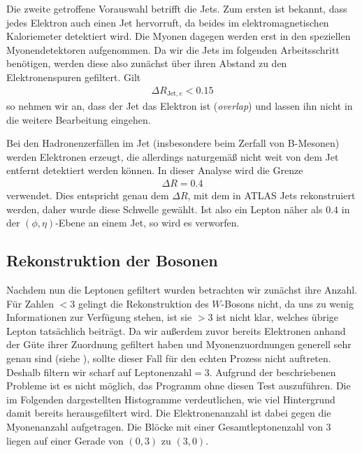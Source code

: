 Die zweite getroffene Vorauswahl betrifft die Jets. Zum ersten ist bekannt, dass
jedes Elektron auch einen Jet hervorruft, da beides im elektromagnetischen
Kaloriemeter detektiert wird. Die Myonen dagegen werden erst in den speziellen
Myonendetektoren aufgenommen. Da wir die Jets im folgenden Arbeitsschritt
benötigen, werden diese also zunächst über ihren Abstand zu den Elektronenspuren
gefiltert. Gilt
\begin{align}
  \Delta R_{\text{Jet},e} < 0.15
\end{align}
so nehmen wir an, dass der Jet das Elektron ist (\emph{overlap}) und lassen ihn
nicht in die weitere Bearbeitung eingehen.

Bei den Hadronenzerfällen im Jet (insbesondere beim Zerfall von B-Mesonen)
werden Elektronen erzeugt, die allerdings naturgemäß nicht weit von dem Jet
entfernt detektiert werden können. In dieser Analyse wird die Grenze
\begin{align}
  \Delta R = 0.4
\end{align}
verwendet. Dies entspricht genau dem $\Delta R$, mit dem in ATLAS Jets
rekonstruiert werden\cite{jet-recon}, daher wurde diese Schwelle gewählt. Ist
also ein Lepton näher als $0.4$ in der $(\phi, \eta)$-Ebene an einem Jet, so
wird es verworfen.

\subsection{Rekonstruktion der Bosonen}
Nachdem nun die Leptonen gefiltert wurden betrachten wir zunächst ihre Anzahl.
Für Zahlen $< 3$ gelingt die Rekonstruktion des $W$-Bosons nicht, da uns zu
wenig Informationen zur Verfügung stehen, ist sie $> 3$ ist nicht klar, welches
übrige Lepton tatsächlich beiträgt. Da wir außerdem zuvor bereits Elektronen
anhand der Güte ihrer Zuordnung gefiltert haben und Myonenzuordnungen generell
sehr genau sind (siehe \cite{myon-zuordnung}), sollte dieser Fall für den echten
Prozess nicht auftreten. Deshalb filtern wir scharf auf $\text{Leptonenzahl} =
3$. Aufgrund der beschriebenen Probleme ist es nicht möglich, das Programm ohne
diesen Test auszuführen. Die im Folgenden dargestellten Histogramme
verdeutlichen, wie viel Hintergrund damit bereits herausgefiltert wird. Die
Elektronenanzahl ist dabei gegen die Myonenanzahl aufgetragen. Die Blöcke mit
einer Gesamtleptonenzahl von 3 liegen auf einer Gerade von $(0, 3)$ zu $(3,0)$.

\begin{figure}
  
  
  
  
  
\end{figure}

